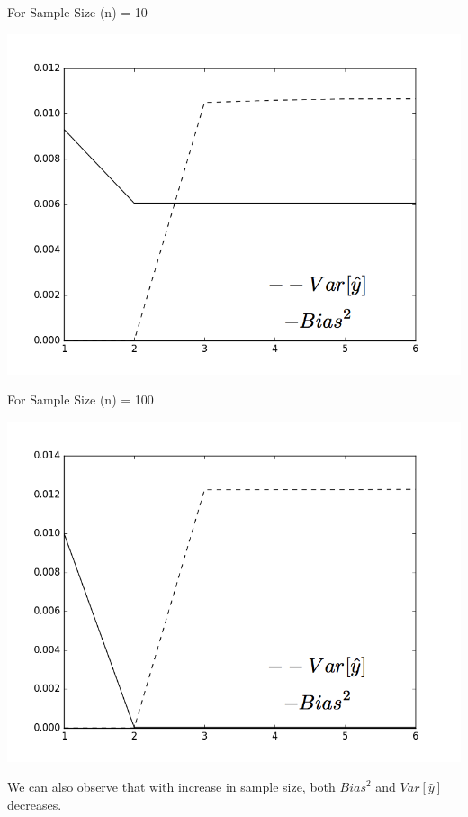 \documentclass[]{report}
\begin{document}
	For Sample Size (n) = 10
	\begin{center}
		\includegraphics[width=\textwidth]{fig_10_BV}
	\end{center}

	For Sample Size (n) = 100
	\begin{center}
		\includegraphics[width=\textwidth]{fig_100_BV}
	\end{center}

	We can also observe that with increase in sample size, both ${Bias}^2$ and $Var[\hat{y}]$ decreases.
\end{document}
